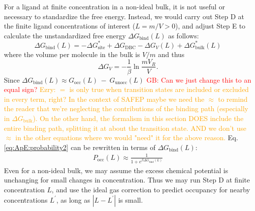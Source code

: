 \documentclass[9pt,tutorial]{Styling/livecoms}
\newcommand{\grace}[1]{\textcolor{red}{GB: #1}}
\newcommand{\ezry}[1]{\textcolor{orange}{Ezry: #1}}
\begin{document}
For a ligand at finite concentration in a non-ideal bulk, it is not useful or necessary to standardize the free energy. Instead, we would carry out Step D at the finite ligand concentrations of interest ($L=m/V>0$), and adjust Step E to calculate the unstandardized free energy $\Delta G_\mathrm{bind}(L)$ as follows: 
\begin{equation}
\Delta G_\mathrm{bind}(L)= - \Delta G_\mathrm{site}^* + \Delta G_\mathrm{DBC} -\Delta G_V(L)+ \Delta G^*_\mathrm{bulk}(L)
\end{equation} 
where the volume per molecule in the bulk is $V/m$ and thus \begin{equation}
\label{eq:idealGas}
    \Delta G_V= -\frac{1}{\beta} \ln \frac{m V_R}{V}. 
\end{equation}
Since
    $\Delta G_\mathrm{bind}(L)\approx G_\mathrm{occ}(L)~-~G_\mathrm{unocc}(L)$
\grace{Can we just change this to an equal sign?}
\ezry{$=$ is only true when transition states are included or excluded in every term, right? In the context of SAFEP maybe we need the $\approx$ to remind the reader that we're neglecting the contributions of the binding path (especially in $\Delta G_\mathrm{bulk}$). On the other hand, the formalism in this section DOES include the entire binding path, splitting it at about the transition state. AND we don't use $\approx$ in the other equations where we would "need" it for the above reason.
}
Eq. \ref{eq:ApE:probability2} can be rewritten in terms of $\Delta G_\mathrm{bind}(L)$:  
\begin{align}
 P_\mathrm{occ}(L)\approx\frac{1}{1+e^{\beta \Delta G_\mathrm{bind}(L)}} \label{eq:ApE:probability3}
\end{align}
Even for a non-ideal bulk, we may assume the excess chemical potential is unchanging for small changes in concentration. Thus we may run Step D at finite concentration $L$, and use the ideal gas correction to predict occupancy for nearby concentrations $L^\prime$, as long as $|L-L^\prime|$ is small.
\end{document}
